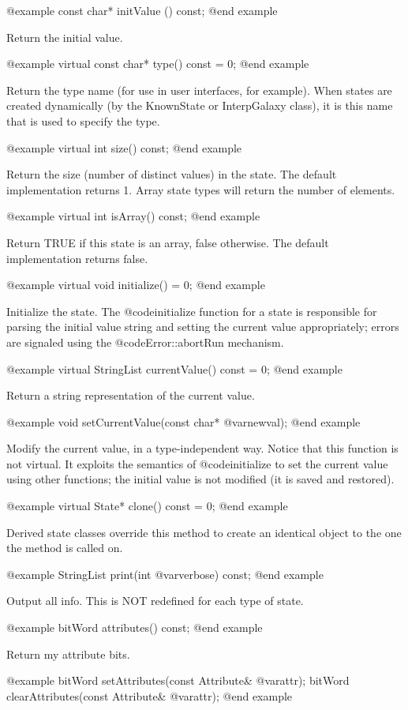 @example
const char* initValue () const;
@end example

Return the initial value.

@example
virtual const char* type() const = 0;
@end example

Return the type name (for use in user interfaces, for example).
When states are created dynamically (by the KnownState or InterpGalaxy
class), it is this name that is used to specify the type.

@example
virtual int size() const;
@end example

Return the size (number of distinct values) in the state.  The
default implementation returns 1.  Array state types will return the
number of elements.

@example
virtual int isArray() const;
@end example

Return TRUE if this state is an array, false otherwise.  The default
implementation returns false.

@example
virtual void initialize() = 0;
@end example

Initialize the state.  The @code{initialize} function for a state is
responsible for parsing the initial value string and setting the current
value appropriately; errors are signaled using the
@code{Error::abortRun} mechanism.

@example
virtual StringList currentValue() const = 0;
@end example

Return a string representation of the current value.

@example
void setCurrentValue(const char* @var{newval});
@end example

Modify the current value, in a type-independent way.  Notice that this
function is not virtual.  It exploits the semantics of @code{initialize}
to set the current value using other functions; the initial value is
not modified (it is saved and restored).

@example
virtual State* clone() const = 0;
@end example

Derived state classes override this method to create an identical
object to the one the method is called on.

@example
StringList print(int @var{verbose}) const;
@end example

Output all info.  This is NOT redefined for each type of state.

@example
bitWord attributes() const;
@end example

Return my attribute bits.

@example
bitWord setAttributes(const Attribute& @var{attr});
bitWord clearAttributes(const Attribute& @var{attr});
@end example

